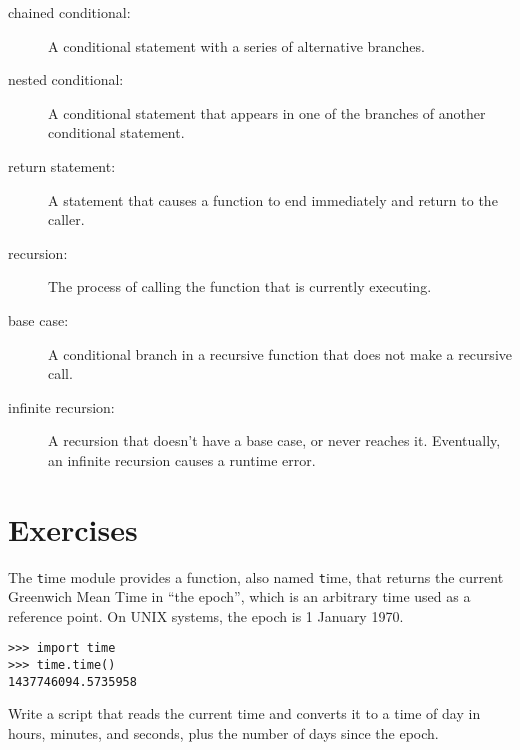 \documentclass[
DIV=11,
fontsize=13,
twoside,
headinclude=false,
titlepage=firstiscover,
abstract=true,
headsepline=true,
footsepline=true,
chapterprefix=true, %
headings=big,
bibliography=totoc,%
captions=tableheading
]{scrbook}
\theoremstyle{definition}
\begin{document}
\begin{description}
\item[chained conditional:]  A conditional statement with a series
of alternative branches.

\item[nested conditional:]  A conditional statement that appears
in one of the branches of another conditional statement.

\item[return statement:] A statement that causes a function to
end immediately and return to the caller.

\item[recursion:]  The process of calling the function that is
currently executing.

\item[base case:]  A conditional branch in a
recursive function that does not make a recursive call.

\item[infinite recursion:]  A recursion that doesn't have a
base case, or never reaches it.  Eventually, an infinite recursion
causes a runtime error.

\end{description}

\section{Exercises}

\begin{exercise}
\normalfont

The {\texttt time} module provides a function, also named {\texttt time}, that
returns the current Greenwich Mean Time in ``the epoch'', which is
an arbitrary time used as a reference point.  On UNIX systems, the
epoch is 1 January 1970.

\begin{lstlisting}
>>> import time
>>> time.time()
1437746094.5735958
\end{lstlisting}

Write a script that reads the current time and converts it to
a time of day in hours, minutes, and seconds, plus the number of
days since the epoch.

\end{exercise}
\end{document}
